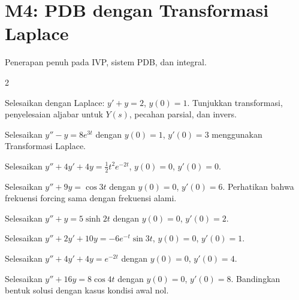 \documentclass[10pt,a4paper]{article}
\newcommand{\level}[1]{\colorbox{levelbg}{\scriptsize\strut #1}}
\newcommand{\src}[1]{\colorbox{sourcebg}{\scriptsize\strut #1}}
\begin{document}
\section*{M4: PDB dengan Transformasi Laplace}
{\color{iteraGray}\small Penerapan penuh pada IVP, sistem PDB, dan integral.}\par\vspace{1mm}
\begin{multicols}{2}
\begin{qbox}[title={M4.1: IVP orde satu\hfill \level{L2}\;\src{Var}}]
\small Selesaikan dengan Laplace: $y'+y=2$, $y(0)=1$. Tunjukkan transformasi, penyelesaian aljabar untuk $Y(s)$, pecahan parsial, dan invers.
\end{qbox}
\begin{qbox}[title={M4.2: IVP orde dua eksponensial\hfill \level{L3}\;\src{PR}}]
\small Selesaikan $y''-y=8e^{3t}$ dengan $y(0)=1$, $y'(0)=3$ menggunakan Transformasi Laplace.
\end{qbox}
\begin{qbox}[title={M4.3: IVP dengan faktor berulang\hfill \level{L3}\;\src{PR}}]
\small Selesaikan $y''+4y'+4y=\tfrac12 t^2e^{-2t}$, $y(0)=0$, $y'(0)=0$.
\end{qbox}
\begin{qbox}[title={M4.4: Resonansi trigonometrik\hfill \level{L3}\;\src{PR}}]
\small Selesaikan $y''+9y=\cos 3t$ dengan $y(0)=0$, $y'(0)=6$. Perhatikan bahwa frekuensi forcing sama dengan frekuensi alami.
\end{qbox}
\begin{qbox}[title={M4.5: Forcing hiperbolik\hfill \level{L3}\;\src{PR}}]
\small Selesaikan $y''+y=5\sinh 2t$ dengan $y(0)=0$, $y'(0)=2$.
\end{qbox}
\begin{qbox}[title={M4.6: Eksponensial-sinus\hfill \level{L3}\;\src{PR}}]
\small Selesaikan $y''+2y'+10y=-6e^{-t}\sin 3t$, $y(0)=0$, $y'(0)=1$.
\end{qbox}
\begin{qbox}[title={M4.7: Varian Boas 1\hfill \level{L3}\;\src{Boas}}]
\small Selesaikan $y''+4y'+4y=e^{-2t}$ dengan $y(0)=0$, $y'(0)=4$.
\end{qbox}
\begin{qbox}[title={M4.8: Varian Boas 2\hfill \level{L3}\;\src{Boas}}]
\small Selesaikan $y''+16y=8\cos 4t$ dengan $y(0)=0$, $y'(0)=8$. Bandingkan bentuk solusi dengan kasus kondisi awal nol.
\end{qbox}
\begin{qbox}[title={M4.9: Sistem PDB I\hfill \level{L4}\;\src{PR}}]

\end{qbox}
\end{multicols}
\end{document}

